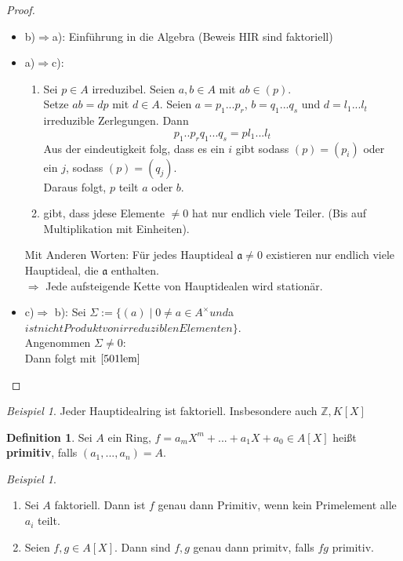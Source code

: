 \documentclass[10pt,a4paper]{article}
\newcommand{\Z}{\ensuremath{\mathbb{Z}}}
\newcounter{thm}[section]
\theoremstyle{definition}
\newtheorem{definition}[thm]{Definition}
\theoremstyle{plain}
\theoremstyle{remark}
\newtheorem{exm}[thm]{Beispiel}
\newtheorem*{exm*}{Beispiel}
\begin{document}
\begin{proof}
	\begin{itemize}
		\item b)$\Rightarrow$a): Einführung in die Algebra (Beweis HIR sind faktoriell)
		\item a)$\Rightarrow$c): 
		\begin{enumerate}
			\item Sei $p\in A$ irreduzibel. Seien $a,b\in A$ mit $ab\in(p)$.\\
			Setze $ab=dp$ mit $d\in A$. Seien $a=p_1...p_r$, $b=q_1...q_s$ und $d=l_1...l_t$ irreduzible Zerlegungen. Dann
			\[p_1..p_rq_1...q_s=pl_1...l_t\]
			Aus der eindeutigkeit folg, dass es ein $i$ gibt sodass $(p)=(p_i)$ oder ein $j$, sodass $(p)=(q_j)$.\\
			Daraus folgt, $p$ teilt $a$ oder $b$.
			\item gibt, dass jdese Elemente $\neq0$ hat nur endlich viele Teiler. (Bis auf Multiplikation mit Einheiten).\\
		\end{enumerate}
		Mit Anderen Worten: Für jedes Hauptideal $\mathfrak a\neq 0$ existieren nur endlich viele Hauptideal, die $\mathfrak a$ enthalten.\\
		$\Rightarrow$ Jede aufsteigende Kette von Hauptidealen wird stationär.
		
		\item c)$\Rightarrow$ b): Sei $\Sigma:=\{(a)\mid\text{$0\neq a\in A^\times$} und $a$ ist nicht Produkt von irreduziblen Elementen \}$.\\
		Angenommen $\Sigma\neq 0$:\\
		Dann folgt mit $\ref{501lem}$ %
	\end{itemize}
\end{proof}

\begin{exm}
	Jeder Hauptidealring ist faktoriell. Insbesondere auch $\Z,K[X]$
\end{exm}
\begin{definition}
	Sei $A$ ein Ring, $f=a_mX^m+...+a_1X+a_0\in A[X]$ heißt \textbf{primitiv}, falls $(a_1,...,a_n)=A$.
\end{definition}
\begin{exm*}
	\begin{enumerate}
		\item Sei $A$ faktoriell. Dann ist $f$ genau dann Primitiv, wenn kein Primelement alle $a_i$ teilt.
		\item Seien $f,g\in A[X]$. Dann sind $f,g$ genau dann primitv, falls $fg$ primitiv.
	\end{enumerate}
\end{exm*}
\end{document}
